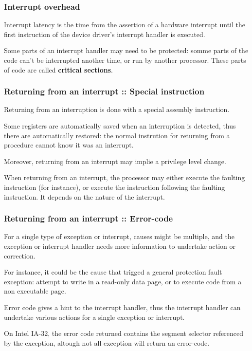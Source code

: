 
\begin{frame}
        \frametitle{Interrupt overhead}

Interrupt latency is the time from the assertion of a hardware interrupt
until the first instruction of the device driver's interrupt handler is
executed.

\-

Some parts of an interrupt handler may need to be protected: somme parts of the code can't be interrupted another time, or run by another processor. These parts of code are called \textbf{critical sections}. 

\end{frame}


\begin{frame}
  \frametitle{Returning from an interrupt :: Special instruction}

Returning from an interruption is done with a special assembly instruction.

\-

Some registers are automatically saved when an interruption is detected, thus there are automatically restored: the normal instrution for returning from a procedure cannot know it was an interrupt.

\-

Moreover, returning from an interrupt may implie a privilege level change.

\-

When returning from an interrupt, the processor may either execute the faulting instruction (for instance), or execute the instruction following the faulting instruction. It depends on the nature of the interrupt.

\end{frame}


\begin{frame}
  \frametitle{Returning from an interrupt :: Error-code}

For a single type of exception or interrupt, causes might be multiple, and the exception or interrupt handler needs more information to undertake action or correction.

\-

For instance, it could be the cause that trigged a general protection fault exception: attempt to write in a read-only data page, or to execute code from a non executable page.

\-

Error code gives a hint to the interrupt handler, thus the interrupt handler can undertake various actions for a single exception or interrupt.

\-

On Intel IA-32, the error code returned contains the segment selector referenced by the exception, altough not all exception will return an error-code.

\end{frame}

